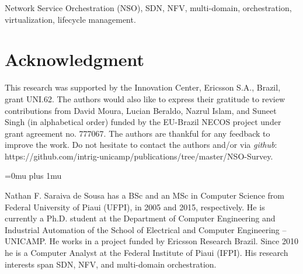 \documentclass[journal]{IEEEtran}
\begin{document}
\begin{IEEEkeywords}
Network Service Orchestration (NSO), SDN, NFV, multi-domain, orchestration, virtualization, lifecycle management.
\end{IEEEkeywords}

\IEEEpeerreviewmaketitle











\section*{Acknowledgment}

This research was supported by the Innovation Center, Ericsson S.A., Brazil, grant UNI.62. The authors would also like to express their gratitude to review contributions from David Moura,  Lucian Beraldo, Nazrul Islam, and Suneet Singh (in alphabetical order) funded by the EU-Brazil NECOS project under grant agreement no. 777067.
The authors are thankful for any feedback to improve the work. Do not hesitate to contact the authors and/or via \textit{github}: 
https://github.com/intrig-unicamp/publications/tree/master/NSO-Survey.

\addtolength{\textheight}{-0.1cm}
\Urlmuskip=0mu plus 1mu\relax



\begin{IEEEbiography}{Nathan F. Saraiva de Sousa}
has a BSc and an MSc in Computer Science from Federal University of Piaui (UFPI), in 2005 and 2015, respectively. He is currently a Ph.D. student at the Department of Computer Engineering and Industrial Automation of the School of Electrical and Computer Engineering – UNICAMP. He works in a project funded by Ericsson Research Brazil. Since 2010 he is a Computer Analyst at the Federal Institute of Piaui (IFPI). His research interests span  SDN, NFV, and multi-domain orchestration.
\end{IEEEbiography}
\end{document}

